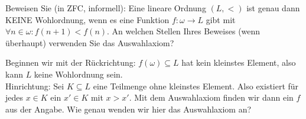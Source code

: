 
\begin{exercise}[286]

Beweisen Sie (in ZFC, informell): Eine lineare Ordnung $(L,<)$ ist genau dann
KEINE Wohlordnung, wenn es eine Funktion $f: \omega \to L$ gibt mit
$\forall n \in \omega: f(n+1) < f(n)$. An welchen Stellen Ihres Beweises
(wenn überhaupt) verwenden Sie das Auswahlaxiom?

\end{exercise}


\begin{solution}

Beginnen wir mit der Rückrichtung: $f(\omega) \subseteq L$ hat kein kleinstes
Element, also kann $L$ keine Wohlordnung sein. \\
Hinrichtung: Sei $K \subseteq L$ eine Teilmenge ohne kleinstes Element.
Also existiert für jedes $x \in K$ ein $x' \in K$ mit $x > x'$.
Mit dem Auswahlaxiom finden wir dann ein $f$ aus der Angabe. Wie genau wenden
wir hier das Auswahlaxiom an?

\end{solution}

